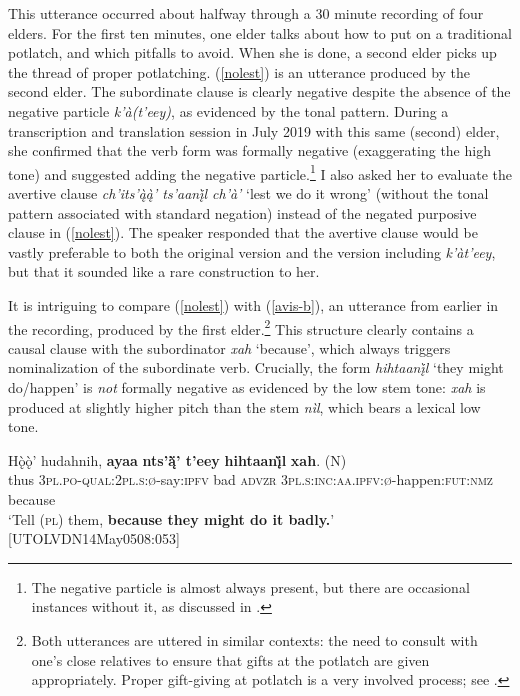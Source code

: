 \documentclass[output=paper,colorlinks,citecolor=brown]{langscibook}
\begin{document}
\noindent This utterance occurred about halfway through a 30 minute recording of four elders. For the first ten minutes, one elder talks about how to put on a traditional potlatch, and which pitfalls to avoid. When she is done, a second elder picks up the thread of proper potlatching. (\ref{nolest}) is an utterance produced by the second elder. The subordinate clause is clearly negative despite the absence of the negative particle \textit{k'à(t'eey)}, as evidenced by the tonal pattern. During a transcription and translation session in July 2019 with this same (second) elder, she confirmed that the verb form was formally negative (exaggerating the high tone) and suggested adding the negative particle.\footnote{The negative particle is almost always present, but there are occasional instances without it, as discussed in \citet{LovickOinprep}.} I also asked her to evaluate the avertive clause \textit{ch'its'ą̀ą̀' ts'aanį̀l ch'à'} `lest we do it wrong' (without the tonal pattern associated with standard negation) instead of the negated purposive clause in (\ref{nolest}). The speaker responded that the avertive clause would be vastly preferable to both the original version and the version including \textit{k'àt'eey}, but that it sounded like a rare construction to her.

\largerpage
It is intriguing to compare (\ref{nolest}) with  (\ref{avis-b}), an utterance from earlier in the recording, produced by the first elder.\footnote{Both utterances are uttered in similar contexts: the need to consult with one's close relatives to ensure that gifts at the potlatch are given appropriately. Proper gift-giving at potlatch is a very involved process; see \citet{SimeoneW1995}.}  This structure clearly contains a causal clause with the subordinator \textit{xah} `because', which always triggers nominalization of the subordinate verb. Crucially, the form \textit{hihtaanį̀l} `they might do/happen' is \textit{not} formally negative as evidenced by the low stem tone: \textit{xah} is produced at slightly higher pitch than the stem \textit{nìl}, which bears a lexical low tone.

\ea
\label{avis-b}
\gll Hǫ̀ǫ̀' hudahnih, \textbf{ayaa} \textbf{nts'ą̈̀' t'eey} \textbf{hihtaanį̀l} {\textbf{xah}. \textnormal{(N)}} \\
thus \textsc{3pl.po-qual:2pl.s:ø}-say:\textsc{ipfv} bad \textsc{advzr} \textsc{3pl.s:inc:aa.ipfv:ø}-happen:\textsc{fut:nmz} because \\
\glt `Tell (\textsc{pl}) them, \textbf{because they might do it badly.}' \\ \hfill [UTOLVDN14May0508:053]
\z
\end{document}
